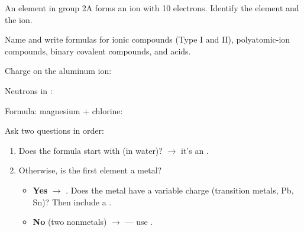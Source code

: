 \documentclass{apchem-notes}
\begin{document}
\begin{exitticket}
An element in group 2A forms an ion with 10 electrons. Identify the element
and the ion. 
\end{exitticket}


\begin{objectives}
  \item Name and write formulas for ionic compounds (Type I and II),
        polyatomic-ion compounds, binary covalent compounds, and acids.
\end{objectives}


\begin{warmup}[3]
  \item Charge on the aluminum ion: 
  \item Neutrons in : 
  \item Formula: magnesium + chlorine: 
\end{warmup}



Ask two questions in order:

\begin{enumerate}[leftmargin=*,itemsep=0.2em]
  \item Does the formula start with  (in water)? $\to$ it's an
        .
  \item Otherwise, is the first element a metal?
        \begin{itemize}[leftmargin=1.4em,itemsep=0.1em]
          \item \textbf{Yes} $\to$ . Does the metal
                have a variable charge (transition metals, Pb, Sn)?
                Then include a .
          \item \textbf{No} (two nonmetals) $\to$
                 --- use
                .
        \end{itemize}
\end{enumerate}
\end{document}
